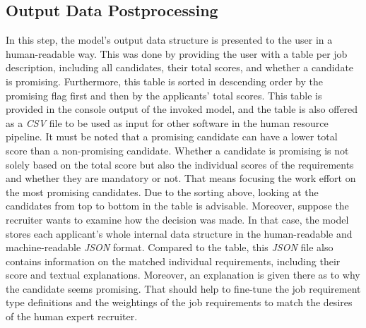 \documentclass[draft,final]{thesisclass} %
\begin{document}
\subsection{Output Data Postprocessing} \label{output_data_postprocessing}
In this step, the model's output data structure is presented to the user in a human-readable way.
This was done by providing the user with a table per job description, including all candidates, their total scores, and whether a candidate is promising.
Furthermore, this table is sorted in descending order by the promising flag first and then by the applicants' total scores.
This table is provided in the console output of the invoked model, and the table is also offered as a \textit{CSV} file to be used as input for other software in the human resource pipeline.
It must be noted that a promising candidate can have a lower total score than a non-promising candidate. Whether a candidate is promising is not solely based on the total score but also the individual scores of the requirements and whether they are mandatory or not.
That means focusing the work effort on the most promising candidates. Due to the sorting above, looking at the candidates from top to bottom in the table is advisable.
Moreover, suppose the recruiter wants to examine how the decision was made. In that case, the model stores each applicant's whole internal data structure in the human-readable and machine-readable \textit{JSON} format.
Compared to the table, this \textit{JSON} file also contains information on the matched individual requirements, including their score and textual explanations.
Moreover, an explanation is given there as to why the candidate seems promising.
That should help to fine-tune the job requirement type definitions and the weightings of the job requirements to match the desires of the human expert recruiter.
\end{document}
